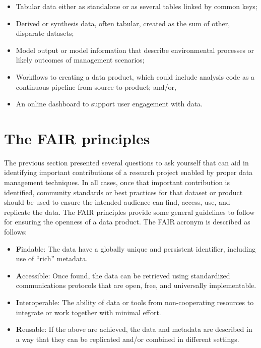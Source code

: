 \documentclass[
]{book}
\providecommand{\tightlist}{%
  \setlength{\itemsep}{0pt}\setlength{\parskip}{0pt}}
\begin{document}
\begin{itemize}
\tightlist
\item
  Tabular data either as standalone or as several tables linked by common keys;
\item
  Derived or synthesis data, often tabular, created as the sum of other, disparate datasets;
\item
  Model output or model information that describe environmental processes or likely outcomes of management scenarios;
\item
  Workflows to creating a data product, which could include analysis code as a continuous pipeline from source to product; and/or,
\item
  An online dashboard to support user engagement with data.
\end{itemize}

\section{The FAIR principles}\label{fair}

The previous section presented several questions to ask yourself that can aid in identifying important contributions of a research project enabled by proper data management techniques. In all cases, once that important contribution is identified, community standards or best practices for that dataset or product should be used to ensure the intended audience can find, access, use, and replicate the data. The FAIR principles \citep{Wilkinson16} provide some general guidelines to follow for ensuring the openness of a data product. The FAIR acronym is described as follows:

\begin{itemize}
\tightlist
\item
  \textbf{F}indable: The data have a globally unique and persistent identifier, including use of ``rich'' metadata.
\item
  \textbf{A}ccessible: Once found, the data can be retrieved using standardized communications protocols that are open, free, and universally implementable.
\item
  \textbf{I}nteroperable: The ability of data or tools from non-cooperating resources to integrate or work together with minimal effort.
\item
  \textbf{R}eusable: If the above are achieved, the data and metadata are described in a way that they can be replicated and/or combined in different settings.
\end{itemize}
\end{document}
